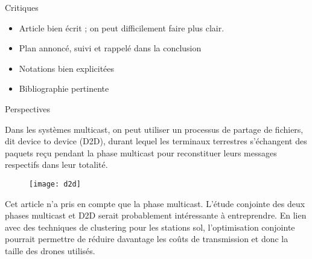 \begin{frame} {Critiques}
\begin{itemize}
	\item Article bien écrit ; on peut difficilement faire plus clair.
	\item Plan annoncé, suivi et rappelé dans la conclusion
	\item Notations bien explicitées
	\item Bibliographie pertinente 
\end{itemize}


\end{frame}



\begin{frame} {Perspectives}

Dans les systèmes multicast, on peut utiliser un processus de partage de fichiers,
dit device to device (D2D), durant lequel les terminaux terrestres
s'échangent des paquets reçu pendant la phase multicast pour reconstituer leurs messages
respectifs dans leur totalité. 


\begin{figure}
	\centering
	\texttt{[image: d2d]}
	\label{fig:d2d}
\end{figure}


\end{frame}


\begin{frame} {}

Cet article n'a pris en compte que la phase multicast. L'étude conjointe
des deux phases multicast et D2D serait probablement intéressante à entreprendre.
En lien avec des techniques de clustering pour les stations sol, l'optimisation
conjointe pourrait permettre de réduire davantage les coûts de transmission et donc la taille des drones
utilisés.

\end{frame}
